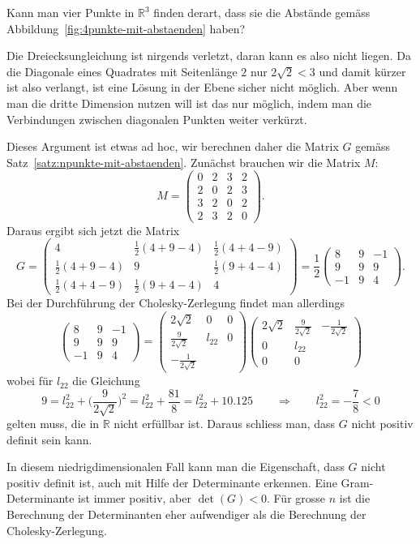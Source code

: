 \begin{beispiel}
Kann man vier Punkte in $\mathbb R^3$ finden derart, dass sie die
Abstände gemäss Abbildung~\ref{fig:4punkte-mit-abstaenden} haben?

Die Dreiecksungleichung ist nirgends verletzt, daran kann es also nicht liegen.
Da die Diagonale eines Quadrates  mit Seitenlänge $2$ nur $2\sqrt{2} < 3$ und
damit kürzer ist also verlangt, ist eine Lösung in der Ebene sicher nicht 
möglich.
Aber wenn man die dritte Dimension nutzen will ist das nur möglich, indem man
die Verbindungen zwischen diagonalen Punkten weiter verkürzt.

Dieses Argument ist etwas ad hoc, wir berechnen daher die Matrix $G$
gemäss Satz~\ref{satz:npunkte-mit-abstaenden}.
Zunächst brauchen wir die Matrix $M$:
\[
M = 
\begin{pmatrix}
0&2&3&2\\
2&0&2&3\\
3&2&0&2\\
2&3&2&0
\end{pmatrix}.
\]
Daraus ergibt sich jetzt die Matrix
\[
G =
\begin{pmatrix}
             4&\frac12(4+9-4)&\frac12(4+4-9)\\
\frac12(4+9-4)&             9&\frac12(9+4-4)\\
\frac12(4+4-9)&\frac12(9+4-4)&             4
\end{pmatrix}
=
\frac12
\begin{pmatrix}
 8& 9&-1\\
 9& 9& 9\\
-1& 9& 4
\end{pmatrix}.
\]
Bei der Durchführung der Cholesky-Zerlegung findet man allerdings
\[
\begin{pmatrix}
 8& 9&-1\\
 9& 9& 9\\
-1& 9& 4
\end{pmatrix}
=
\begin{pmatrix}
2\sqrt{2}            &   0    & 0 \\
\frac{9}{2\sqrt{2}}  & l_{22} & 0 \\
-\frac{1}{2\sqrt{2}} &        &   
\end{pmatrix}
\begin{pmatrix}
2\sqrt{2} & \frac{9}{2\sqrt{2}} & -\frac{1}{2\sqrt{2}} \\
0         &     l_{22}          &                      \\
0         &            0        &         
\end{pmatrix}
\]
wobei für $l_{22}$ die Gleichung
\[
9
=
l_{22}^2 + \biggl(\frac{9}{2\sqrt{2}}\biggr)^2
=
l_{22}^2 + \frac{81}{8}
=
l_{22}^2 + 10.125
\qquad\Rightarrow\qquad
l_{22}^2 = -\frac{7}{8} < 0
\]
gelten muss, die in $\mathbb{R}$ nicht erfüllbar ist.
Daraus schliess man, dass $G$ nicht positiv definit sein kann.

In diesem niedrigdimensionalen Fall kann man die Eigenschaft, dass
$G$ nicht positiv definit ist, auch mit Hilfe der Determinante erkennen.
Eine Gram-Determinante ist immer positiv, aber $\det(G)<0$.
Für grosse $n$ ist die Berechnung der Determinanten eher aufwendiger
als die Berechnung der Cholesky-Zerlegung.
\end{beispiel}

